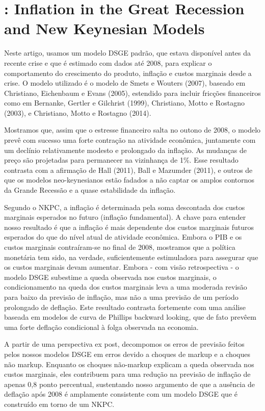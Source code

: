 \documentclass[11pt,oneside,a4paper]{article}
\begin{document}
\section{\citet{Del-Negro:2015}: Inflation in the Great Recession and New Keynesian Models}

Neste artigo, usamos um modelo DSGE padrão, que estava disponível antes da recente crise e que é estimado com dados até 2008, para explicar o comportamento do crescimento do produto, inflação e custos marginais desde a crise. O modelo utilizado é o modelo de Smets e Wouters (2007), baseado em Christiano, Eichenbaum e Evans (2005), estendido para incluir fricções financeiros como em Bernanke, Gertler e Gilchrist (1999), Christiano, Motto e Rostagno (2003), e Christiano, Motto e Rostagno (2014).

Mostramos que, assim que o estresse financeiro salta no outono de 2008, o modelo prevê com sucesso uma forte contração na atividade econômica, juntamente com um declínio relativamente modesto e prolongado da inflação. As mudanças de preço são projetadas para permanecer na vizinhança de 1$\%$. Esse resultado contrasta com a afirmação de Hall (2011), Ball e Mazumder (2011), e outros de que os modelos neo-keynesianos estão fadados a não captar os amplos contornos da Grande Recessão e a quase estabilidade da inflação.

Segundo o NKPC, a inflação é determinada pela soma descontada dos custos marginais esperados no futuro (inflação fundamental). A chave para entender nosso resultado é que a inflação é mais dependente dos custos marginais futuros esperados do que do nível atual de atividade econômica. Embora o PIB e os custos marginais contraíram-se no final de 2008, mostramos que a política monetária tem sido, na verdade, suficientemente estimuladora para assegurar que os custos marginais devam aumentar. Embora - com visão retrospectiva - o modelo DSGE subestime a queda observada nos custos marginais, o condicionamento na queda dos custos marginais leva a uma moderada revisão para baixo da previsão de inflação, mas não a uma previsão de um período prolongado de deflação. Este resultado contrasta fortemente com uma análise baseada em modelos de curva de Phillips backward looking, que de fato prevêem uma forte deflação condicional à folga observada na economia.

A partir de uma perspectiva ex post, decompomos os erros de previsão feitos pelos nossos modelos DSGE em erros devido a choques de markup e a choques não markup. Enquanto os choques não-markup explicam a queda observada nos custos marginais, eles contribuem para uma redução na previsão de inflação de apenas 0,8 ponto percentual, sustentando nosso argumento de que a ausência de deflação após 2008 é amplamente
consistente com um modelo DSGE que é construído em torno de um NKPC.
\end{document}
